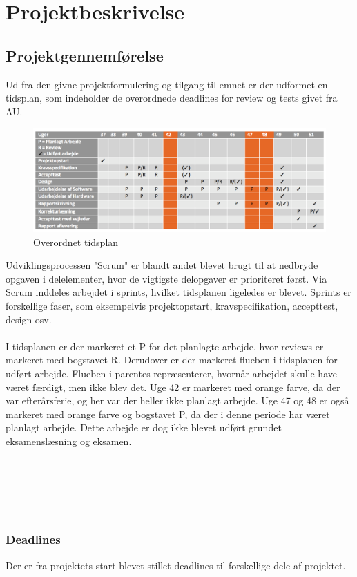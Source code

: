 \chapter{Projektbeskrivelse}


\section{Projektgennemførelse}
Ud fra den givne projektformulering og tilgang til emnet er der udformet en tidsplan, som indeholder de overordnede deadlines for review og tests givet fra AU.
\begin{figure}[H]
	\centering
	\includegraphics[width=1\textwidth]{Figurer/Snip20151210_74.png}
	\caption{Overordnet tidsplan}
\end{figure}
Udviklingsprocessen "Scrum" er blandt andet blevet brugt til at nedbryde opgaven i delelementer, hvor de vigtigste delopgaver er prioriteret først. Via Scrum inddeles arbejdet i sprints, hvilket tidsplanen ligeledes er blevet. Sprints er forskellige faser, som eksempelvis projektopstart, kravspecifikation, accepttest, design osv.\\\\
I tidsplanen er der markeret et P for det planlagte arbejde, hvor reviews er markeret med bogstavet R. Derudover er der markeret flueben i tidsplanen for udført arbejde. Flueben i parentes repræsenterer, hvornår arbejdet skulle have været færdigt, men ikke blev det. Uge 42 er markeret med orange farve, da der var efterårsferie, og her var der heller ikke planlagt arbejde. Uge 47 og 48 er også markeret med orange farve og bogstavet P, da der i denne periode har været planlagt arbejde. Dette arbejde er dog ikke blevet udført grundet eksamenslæsning og eksamen.
\\\\
\\\\
\\\\
\subsection{Deadlines}
Der er fra projektets start blevet stillet deadlines til forskellige dele af projektet.

